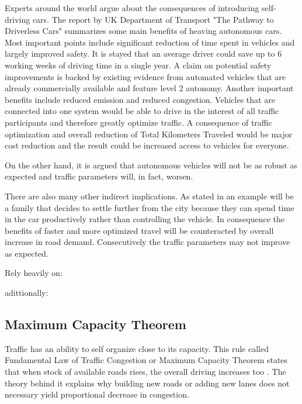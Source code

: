 \documentclass[11pt,english]{article}
\begin{document}
Experts around the world argue about the consequences of introducing self-driving cars. The report by UK Department of Transport "The Pathway to Driverless Cars" summarizes some main benefits of heaving autonomous cars. Most important points include significant reduction of time spent in vehicles and largely improved safety. It is stayed that an average driver could save up to 6 working weeks of driving time in a single year. A claim on potential safety improvements is backed by existing evidence from automated vehicles that are already commercially available and feature level 2 autonomy. Another important benefits include reduced emission and reduced congestion. Vehicles that are connected into one system would be able to drive in the interest of all traffic participants and therefore greatly optimize traffic. 
A consequence of traffic optimization and overall reduction of Total Kilometers Traveled would be major cost reduction and the result could be increased access to vehicles for everyone\citep{pathwaytodriverless}.


On the other hand, it is argued that autonomous vehicles will not be as robust as expected and traffic parameters will, in fact, worsen\citep{sivak2015road}.

There are also many other indirect implications. As stated in \citep{litman2014autonomous} an example will be a family that decides to settle further from the city because they can spend time in the car productively rather than controlling the vehicle. In consequence the benefits of faster and more optimized travel will be counteracted by overall increase in road demand. Consecutively the traffic parameters may not improve as expected.




Rely heavily on:
\citep{litman2014autonomous}

adittionally:





\subsection{Maximum Capacity Theorem}
Traffic has an ability to self organize close to its capacity. This rule called Fundamental Law of Traffic Congestion or Maximum Capacity Theorem states that when stock of available roads rises, the overall driving increases too \citep{duranton2011fundamental}. The theory behind it explains why building new roads or adding new lanes does not necessary yield proportional decrease in congestion.
\end{document}
